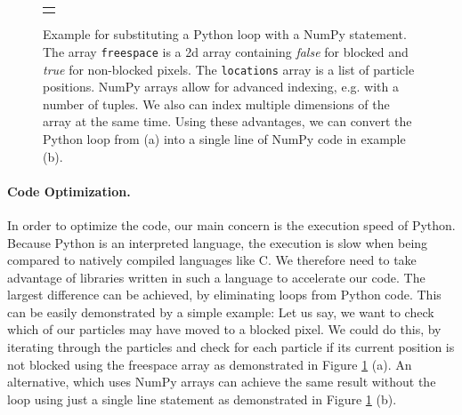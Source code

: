 \begin{figure}[htp]
    \begin{center}
        \begin{tabular}{c}
            \parbox{0.9\columnwidth}{} \\
             \\
            \addlinespace[0.5cm]
            \parbox{0.9\columnwidth}{} \\
             \\
            
        \end{tabular}
    \end{center}
    \vspace{-0.25cm}
    \caption[Example for Python Loop Substitution with NumPy]{Example for substituting a Python loop with a NumPy statement. The array \texttt{freespace} is a 2d array containing \textit{false} for blocked and \textit{true} for non-blocked pixels. The \texttt{locations} array is a list of particle positions. NumPy arrays allow for advanced indexing, e.g. with a number of tuples. We also can index multiple dimensions of the array at the same time. Using these advantages, we can convert the Python loop from (a) into a single line of NumPy code in example (b).} \label{fig:MazeImplementation/Loops}
\end{figure}


\paragraph{Code Optimization. }
In order to optimize the code, our main concern is the execution speed of Python. Because Python is an interpreted language, the execution is slow when being compared to natively compiled languages like C. We therefore need to take advantage of libraries written in such a language to accelerate our code. The largest difference can be achieved, by eliminating loops from Python code. This can be easily demonstrated by a simple example: Let us say, we want to check which of our particles may have moved to a blocked pixel. We could do this, by iterating through the particles and check for each particle if its current position is not blocked using the freespace array  as demonstrated in Figure \ref{fig:MazeImplementation/Loops} (a). An alternative, which uses NumPy arrays can achieve the same result without the loop using just a single line statement as demonstrated in Figure \ref{fig:MazeImplementation/Loops} (b). 

